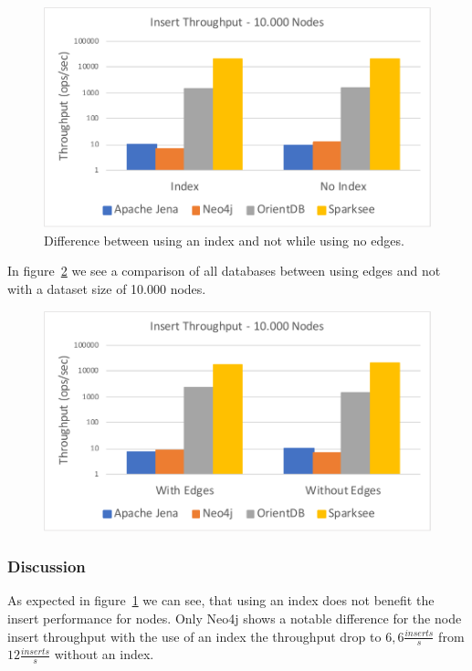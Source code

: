 \begin{figure}[h!]
  \centering
  \includegraphics[width=.75\textwidth]{images/throughput/noEdges}
  \caption{Difference between using an index and not while using no edges.}
  \label{fig:noEdges}
\end{figure}

In figure~\ref{fig:indexNoEdges10000Nodes} we see a comparison of all databases between using edges and not with a dataset size of 10.000 nodes.

\begin{figure}[h!]
  \centering
  \includegraphics[width=.75\textwidth]{images/throughput/indexNoEdges10000Nodes}
  \label{fig:indexNoEdges10000Nodes}
\end{figure}

\subsubsection{Discussion}
As expected in figure~\ref{fig:noEdges} we can see,
that using an index does not benefit the insert performance for nodes.
Only Neo4j shows a notable difference for the node insert throughput with the use of an index the throughput drop to $ 6,6 \frac{inserts}{s} $ from $ 12 \frac{inserts}{s} $ without an index.

